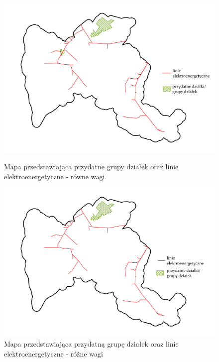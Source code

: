 \documentclass{article}
\begin{document}
\begin{figure}[H]
    \begin{minipage}[t]{0.48\textwidth}
        \centering
        \includegraphics[width=\linewidth]{img/dzialki-linie.jpg}
        \caption{Mapa przedstawiająca przydatne grupy działek oraz linie elektroenergetyczne - równe wagi}
        \label{fig:dzialki-linie-rowne}
    \end{minipage}
    \hfill
    \begin{minipage}[t]{0.48\textwidth}
        \centering
        \includegraphics[width=\linewidth]{img/roznewagi-dzialki-linie.jpg}
        \caption{Mapa przedstawiająca przydatną grupę działek oraz linie elektroenergetyczne - różne wagi}
        \label{fig:dzialki-linie-rozne}
    \end{minipage}
\end{figure}
\vspace{10pt}
\end{document}

